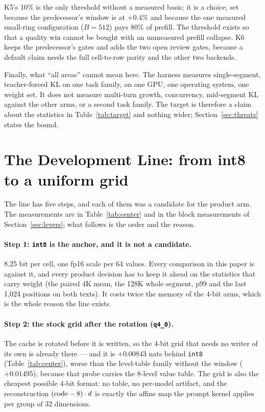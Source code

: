 \documentclass[10pt,twocolumn]{article}
\begin{document}
K5's 10\% is the only threshold without a measured basis; it is a choice, set because the predecessor's window is at $+0.4\%$ and because the one measured small-ring configuration ($B{=}512$) pays 80\% of prefill. The threshold exists so that a quality win cannot be bought with an unmeasured prefill collapse. K6 keeps the predecessor's gates and adds the two open review gates, because a default claim needs the full cell-to-row parity and the other two backends.

Finally, what ``all areas'' cannot mean here. The harness measures single-segment, teacher-forced KL on one task family, on one GPU, one operating system, one weight set. It does not measure multi-turn growth, concurrency, mid-segment KL against the other arms, or a second task family. The target is therefore a claim about the statistics in Table~\ref{tab:target} and nothing wider; Section~\ref{sec:threats} states the bound.

\section{The Development Line: from int8 to a uniform grid}\label{sec:line}

The line has five steps, and each of them was a candidate for the product arm. The measurements are in
Table~\ref{tab:center} and in the block measurements of Section~\ref{sec:levers}; what follows is the order
and the reason.

\paragraph{Step 1: \texttt{int8} is the anchor, and it is not a candidate.} 8.25 bit per cell, one fp16 scale
per 64 values. Every comparison in this paper is against it, and every product decision has to keep it ahead
on the statistics that carry weight (the paired 4K mean, the 128K whole segment, p99 and the last 1,024
positions on both texts). It costs twice the memory of the 4-bit arms, which is the whole reason the line
exists.

\paragraph{Step 2: the stock grid after the rotation (\texttt{q4\_0}).} The cache is rotated before it is
written, so the 4-bit grid that needs no writer of its own is already there --- and it is $+0.00843$ nats
behind \texttt{int8} (Table~\ref{tab:center}), worse than the level-table family without the window
($+0.01495$), because that probe carries the 8-level value table. The grid is also the cheapest possible
4-bit format: no table, no per-model artifact, and the reconstruction $({\rm code}-8)\cdot d$ is exactly the
affine map the prompt kernel applies per group of 32 dimensions.
\end{document}
